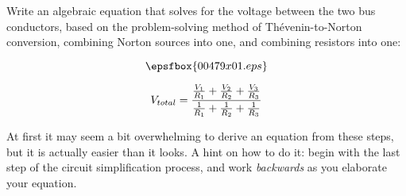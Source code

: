 

Write an algebraic equation that solves for the voltage between the two bus conductors, based on the problem-solving method of Th\'evenin-to-Norton conversion, combining Norton sources into one, and combining resistors into one:

$$\epsfbox{00479x01.eps}$$







$$V_{total} = {{V_1 \over R_1} + {V_2 \over R_2} + {V_3 \over R_3} \over {1 \over R_1} + {1 \over R_2} + {1 \over R_3}}$$







At first it may seem a bit overwhelming to derive an equation from these steps, but it is actually easier than it looks.  A hint on how to do it: begin with the last step of the circuit simplification process, and work {\it backwards} as you elaborate your equation.




